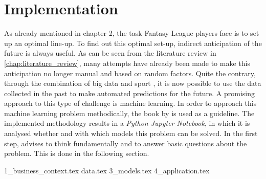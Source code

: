 \chapter{Implementation}

As already mentioned in chapter 2, the task Fantasy League players face is to set up an optimal line-up. To find out this optimal set-up, indirect anticipation of the future is always useful. As can be seen from the literature review in \autoref{chap:literature_review}, many attempts have already been made to make this anticipation no longer manual and based on random factors. Quite the contrary, through the combination of big data and sport \parencite[][cf.]{rein_big_2016}, it is now possible to use the data collected in the past to make automated predictions for the future. A promising approach to this type of challenge is machine learning. In order to approach this machine learning problem methodically, the book  by \citeauthor{geron_hands-machine_2019} is used as a guideline. The implemented methodology results in a \emph{Python Jupyter Notebook}, in which it is analysed whether and with which models this problem can be solved. In the first step, \citeauthor{geron_hands-machine_2019} advises to think fundamentally and to answer basic questions about the problem. This is done in the following section.


{1_business_context.tex}
{data.tex}
{3_models.tex}
{4_application.tex}



